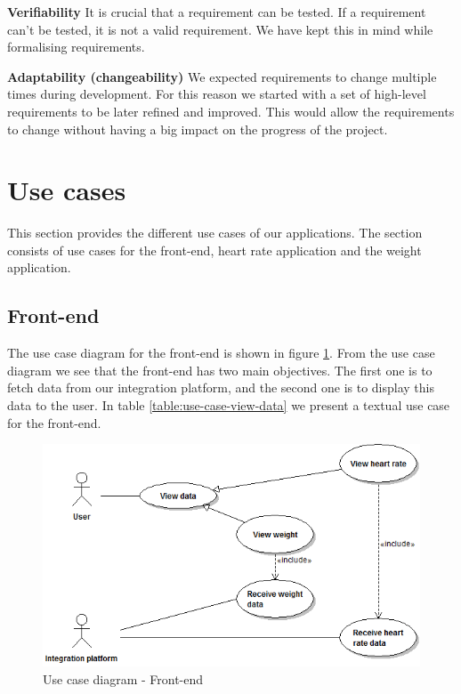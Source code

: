 \textbf{Verifiability}\newline
It is crucial that a requirement can be tested. If a requirement can't be tested, it is not a valid requirement.
We have kept this in mind while formalising requirements.

\textbf{Adaptability (changeability)}\newline
We expected requirements to change multiple times during development.
For this reason we started with a set of high-level requirements to be later refined and improved.
This would allow the requirements to change without having a big impact on the progress of the project.


\section{Use cases}
\label{section:usecases}

This section provides  the different use cases of our applications.
The section consists of use cases for the front-end, heart rate application and the weight application.

\subsection{Front-end}

The use case diagram for the front-end is shown in figure \ref{figure:use-case-diagram-front-end}.
From the use case diagram we see that the front-end has two main objectives.
The first one is to fetch data from our integration platform, and the second one is to display this data to the user.
In table \ref{table:use-case-view-data} we present a textual use case for the front-end.

\begin{figure}[H]
\centering
\includegraphics[scale=0.6]{../Figures/use-case-diagram-front-end.png}
\caption{Use case diagram - Front-end}
\label{figure:use-case-diagram-front-end}
\end{figure}

